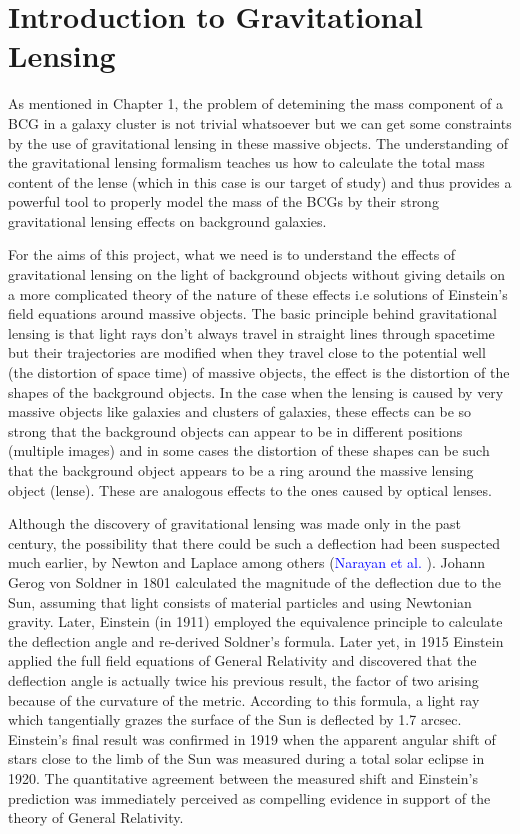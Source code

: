 \chapter{Introduction to Gravitational Lensing}

As mentioned in Chapter 1, the problem of detemining the mass component of a BCG in a galaxy cluster is not trivial whatsoever but we can get some constraints by the use of gravitational lensing in these massive objects. The understanding of the gravitational lensing formalism teaches us how to calculate the total mass content of the lense (which in this case is our target of study) and thus provides a powerful tool to properly model the mass of the BCGs by their strong gravitational lensing effects on background galaxies. 

For the aims of this project, what we need is to understand the effects of gravitational lensing on the light of background objects without giving details on a more complicated theory of the nature of these effects i.e solutions of Einstein's field equations around massive objects. The basic principle behind gravitational lensing is that light rays don't always travel in straight lines through spacetime but their trajectories are modified when they travel close to the potential well (the distortion of space time) of massive objects, the effect is the distortion of the shapes of the background objects. In the case when the lensing is caused by very massive objects like galaxies and clusters of galaxies, these effects can be so strong that the background objects can appear to be in different positions (multiple images) and in some cases the distortion of these shapes can be such that the background object appears to be a ring around the massive lensing object (lense). These are analogous effects to the ones caused by optical lenses. 

Although the discovery of gravitational lensing was made only in the past century, the possibility that there could be such a deflection had been suspected much earlier, by Newton and Laplace among others (\textcolor{blue}{Narayan et al.} \citeyear{Reference25}). Johann Gerog von Soldner in 1801 calculated the magnitude of the deflection due to the Sun, assuming that light consists of material particles and using Newtonian gravity. Later, Einstein (in 1911) employed the equivalence principle to calculate the deflection angle and re-derived Soldner’s formula. Later yet, in 1915 Einstein applied the full field equations of General Relativity and discovered that the deflection angle is actually twice his previous result, the factor of two arising because of the curvature of the metric. According to this formula, a light ray which tangentially grazes the surface of the Sun is deflected by 1.7 arcsec. Einstein’s final result was confirmed in 1919 when the apparent angular shift of stars close to the limb of the Sun was measured during a total solar eclipse in 1920. The quantitative agreement between the measured shift and Einstein’s prediction was immediately perceived as compelling evidence in support of the theory of General Relativity.

